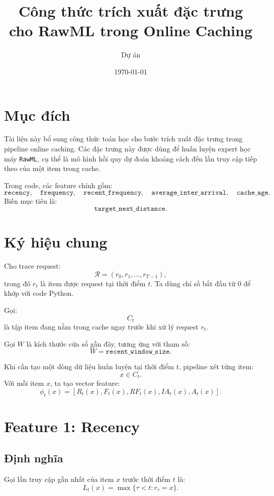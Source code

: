 \documentclass[11pt,a4paper]{article}
\title{\bfseries\sffamily Công thức trích xuất đặc trưng cho RawML trong Online Caching}
\author{Dự án \code{tin03092006-cell/Online-Caching}}
\date{\today}
\newcommand{\code}[1]{\texttt{#1}}
\begin{document}
\maketitle

\section{Mục đích}

Tài liệu này bổ sung công thức toán học cho bước trích xuất đặc trưng trong pipeline online caching. Các đặc trưng này được dùng để huấn luyện expert học máy \code{RawML}, cụ thể là mô hình hồi quy dự đoán khoảng cách đến lần truy cập tiếp theo của một item trong cache.

Trong code, các feature chính gồm:
\[
    \code{recency},\quad
    \code{frequency},\quad
    \code{recent\_frequency},\quad
    \code{average\_inter\_arrival},\quad
    \code{cache\_age}.
\]
Biến mục tiêu là:
\[
    \code{target\_next\_distance}.
\]

\section{Ký hiệu chung}

Cho trace request:
\[
    \mathcal{R} = (r_0,r_1,\ldots,r_{T-1}),
\]
trong đó \(r_t\) là item được request tại thời điểm \(t\). Ta dùng chỉ số bắt đầu từ 0 để khớp với code Python.

Gọi:
\[
    C_t
\]
là tập item đang nằm trong cache ngay trước khi xử lý request \(r_t\).

Gọi \(W\) là kích thước cửa sổ gần đây, tương ứng với tham số:
\[
    W = \code{recent\_window\_size}.
\]

Khi cần tạo một dòng dữ liệu huấn luyện tại thời điểm \(t\), pipeline xét từng item:
\[
    x \in C_t.
\]
Với mỗi item \(x\), ta tạo vector feature:
\[
    \phi_t(x)
    =
    \left[
    R_t(x),
    F_t(x),
    RF_t(x),
    IA_t(x),
    A_t(x)
    \right].
\]

\section{Feature 1: Recency}

\subsection{Định nghĩa}

Gọi lần truy cập gần nhất của item \(x\) trước thời điểm \(t\) là:
\[
    L_t(x)
    =
    \max\{\tau < t : r_{\tau}=x\}.
\]
\end{document}
